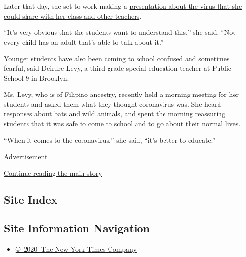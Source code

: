 Later that day, she set to work making a
\href{https://docs.google.com/presentation/d/1HGQ3_xUlLwSstRVsn9XvQzfs9ucib55yf6IrheZhQaM/edit\#slide=id.g70fd9b34e6_0_198}{presentation
about the virus that she could share with her class and other teachers}.

``It's very obvious that the students want to understand this,'' she
said. ``Not every child has an adult that's able to talk about it.''

Younger students have also been coming to school confused and sometimes
fearful, said Deirdre Levy, a third-grade special education teacher at
Public School 9 in Brooklyn.

Ms. Levy, who is of Filipino ancestry, recently held a morning meeting
for her students and asked them what they thought coronavirus was. She
heard responses about bats and wild animals, and spent the morning
reassuring students that it was safe to come to school and to go about
their normal lives.

``When it comes to the coronavirus,'' she said, ``it's better to
educate.''

Advertisement

\protect\hyperlink{after-bottom}{Continue reading the main story}

\hypertarget{site-index}{%
\subsection{Site Index}\label{site-index}}

\hypertarget{site-information-navigation}{%
\subsection{Site Information
Navigation}\label{site-information-navigation}}

\begin{itemize}
\tightlist
\item
  \href{https://help.nytimes.com/hc/en-us/articles/115014792127-Copyright-notice}{©~2020~The
  New York Times Company}
\end{itemize}

